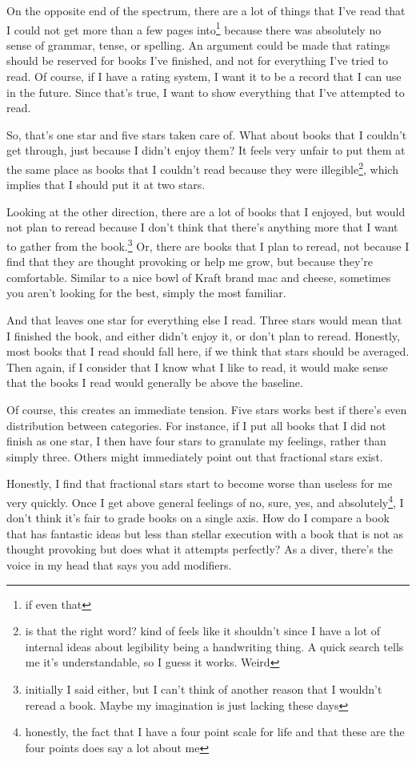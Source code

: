 \documentclass[12pt]{article}[titlepage]
\newcommand{\1}{\={a}}
\newcommand{\2}{\={e}}
\newcommand{\3}{\={\i}}
\newcommand{\4}{\=o}
\newcommand{\5}{\=u}
\newcommand{\6}{\={A}}
\renewcommand{\,}{\textsuperscript{,}}
\begin{document}
On the opposite end of the spectrum, there are a lot of things that I've read that I could not get more than a few pages into\footnote{if even that} because there was absolutely no sense of grammar, tense, or spelling.
An argument could be made that ratings should be reserved for books I've finished, and not for everything I've tried to read.
Of course, if I have a rating system, I want it to be a record that I can use in the future.
Since that's true, I want to show everything that I've attempted to read.

So, that's one star and five stars taken care of.
What about books that I couldn't get through, just because I didn't enjoy them?
It feels very unfair to put them at the same place as books that I couldn't read because they were illegible\footnote{is that the right word? kind of feels like it shouldn't since I have a lot of internal ideas about legibility being a handwriting thing. A quick search tells me it's understandable, so I guess it works. Weird}, which implies that I should put it at two stars.

Looking at the other direction, there are a lot of books that I enjoyed, but would not plan to reread because I don't think that there's anything more that I want to gather from the book.\footnote{initially I said either, but I can't think of another reason that I wouldn't reread a book. Maybe my imagination is just lacking these days}
Or, there are books that I plan to reread, not because I find that they are thought provoking or help me grow, but because they're comfortable.
Similar to a nice bowl of Kraft brand mac and cheese, sometimes you aren't looking for the best, simply the most familiar.

And that leaves one star for everything else I read.
Three stars would mean that I finished the book, and either didn't enjoy it, or don't plan to reread.
Honestly, most books that I read should fall here, if we think that stars should be averaged.
Then again, if I consider that I know what I like to read, it would make sense that the books I read would generally be above the baseline.

Of course, this creates an immediate tension.
Five stars works best if there's even distribution between categories.
For instance, if I put all books that I did not finish as one star, I then have four stars to granulate my feelings, rather than simply three.
Others might immediately point out that fractional stars exist.

Honestly, I find that fractional stars start to become worse than useless for me very quickly.
Once I get above general feelings of no, sure, yes, and absolutely\footnote{honestly, the fact that I have a four point scale for life and that these are the four points does say a lot about me}, I don't think it's fair to grade books on a single axis.
How do I compare a book that has fantastic ideas but less than stellar execution with a book that is not as thought provoking but does what it attempts perfectly?
As a diver, there's the voice in my head that says you add modifiers.
\end{document}
